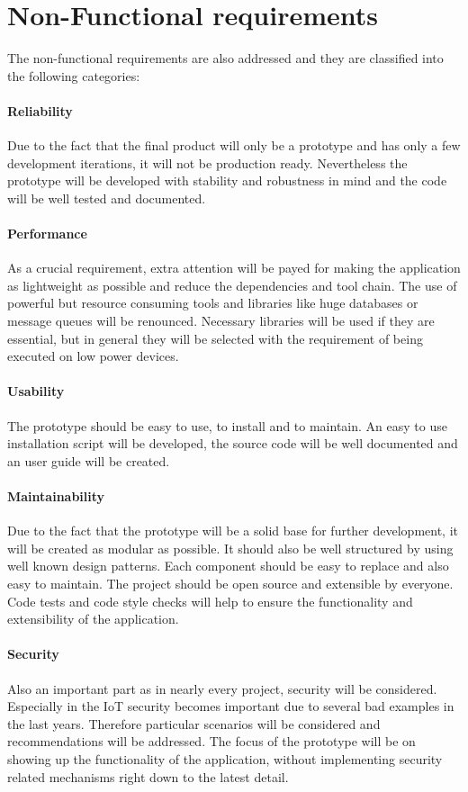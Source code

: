 \section{Non-Functional requirements}
\label{section:non-functional-requirements}
The non-functional requirements are also addressed and they are classified into the following categories:

\paragraph{Reliability} Due to the fact that the final product will only be a prototype and has only a few development iterations, it will not be production ready. Nevertheless the prototype will be developed with stability and robustness in mind and the code will be well tested and documented.
\paragraph{Performance} As a crucial requirement, extra attention will be payed for making the application as lightweight as possible and reduce the dependencies and tool chain.
The use of powerful but resource consuming tools and libraries like huge databases or message queues will be renounced.
Necessary libraries will be used if they are essential, but in general they will be selected with the requirement of being executed on low power devices.
\paragraph{Usability} The prototype should be easy to use, to install and to maintain.
An easy to use installation script will be developed, the source code will be well documented and an user guide will be created.
\paragraph{Maintainability} Due to the fact that the prototype will be a solid base for further development, it will be created as modular as possible.
It should also be well structured by using well known design patterns.
Each component should be easy to replace and also easy to maintain.
The project should be open source and extensible by everyone.
Code tests and code style checks will help to ensure the functionality and extensibility of the application.
\paragraph{Security} Also an important part as in nearly every project, security will be considered.
Especially in the \ac{IoT} security becomes important due to several bad examples in the last years.%
Therefore particular scenarios will be considered and recommendations will be addressed.
The focus of the prototype will be on showing up the functionality of the application, without implementing security related mechanisms right down to the latest detail.
